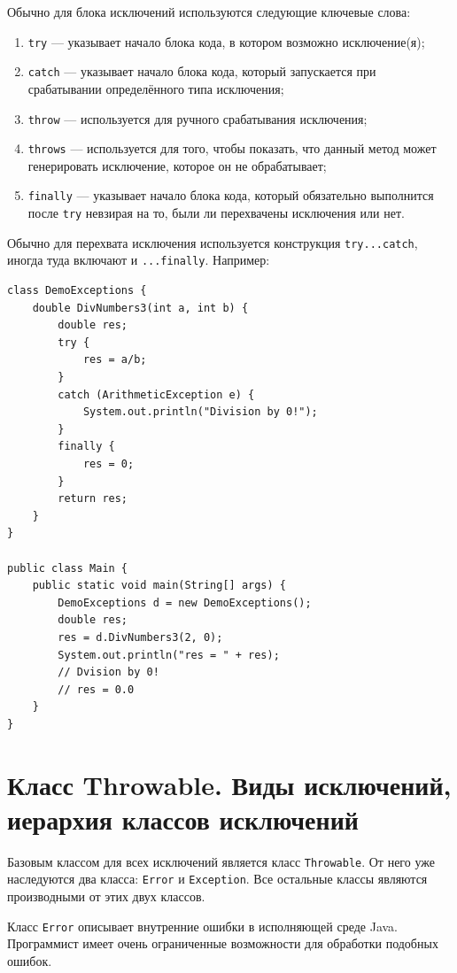 \documentclass{report}
\begin{document}
Обычно для блока исключений используются следующие ключевые слова:

\begin{enumerate}
    \item \verb|try| — указывает начало блока кода, в котором возможно исключение(я);
    \item \verb|catch| — указывает начало блока кода, который запускается при срабатывании определённого типа исключения;
    \item \verb|throw| — используется для ручного срабатывания исключения;
    \item \verb|throws| — используется для того, чтобы показать, что данный метод может генерировать исключение, которое он не обрабатывает;
    \item \verb|finally| — указывает начало блока кода, который обязательно выполнится после \verb|try| невзирая на то, были ли перехвачены исключения или нет.
\end{enumerate}

Обычно для перехвата исключения используется конструкция \verb|try...catch|, иногда туда включают и \verb|...finally|. Например:

\begin{lstlisting}
class DemoExceptions {
    double DivNumbers3(int a, int b) {
        double res;
        try {
            res = a/b;
        }
        catch (ArithmeticException e) {
            System.out.println("Division by 0!");
        }
        finally {
            res = 0;
        }
        return res;
    }
}

public class Main {
    public static void main(String[] args) {
        DemoExceptions d = new DemoExceptions();
        double res;
        res = d.DivNumbers3(2, 0);
        System.out.println("res = " + res);
        // Dvision by 0!
        // res = 0.0
    }
}
\end{lstlisting}

\section{Класс Throwable. Виды исключений, иерархия классов исключений}

Базовым классом для всех исключений является класс \verb|Throwable|. От него уже наследуются два класса: \verb|Error| и \verb|Exception|. Все остальные классы являются производными от этих двух классов.

Класс \verb|Error| описывает внутренние ошибки в исполняющей среде Java. Программист имеет очень ограниченные возможности для обработки подобных ошибок.
\end{document}
